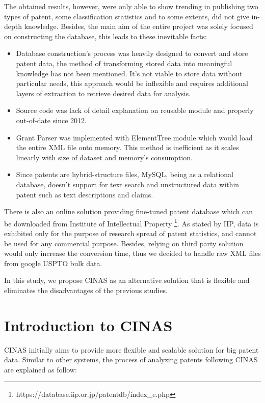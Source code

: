 \documentclass{sig-alternate}
\begin{document}
{The obtained results, however, were only able to show trending in publishing two types of patent, some classification statistics and to some extents, did not give in-depth knowledge. Besides, the main aim of the entire project was solely focused on constructing the database, this leads to these inevitable facts:

\begin{itemize}
\item Database construction's process was heavily designed to convert and store patent data, the method of transforming stored data into meaningful knowledge has not been mentioned. It's not viable to store data without particular needs, this approach would be inflexible and requires additional layers of extraction to retrieve desired data for analysis.
\item Source code was lack of detail explanation on reusable module and properly out-of-date since 2012.
\item Grant Parser was implemented with ElementTree module which would load the entire XML file onto memory. This method is inefficient as it scales linearly with size of dataset and memory's consumption.
\item Since patents are hybrid-structure files, MySQL, being as a relational database, doesn't support for text search and unstructured data within patent such as text descriptions and claims. 
\end{itemize}

There is also an online solution providing fine-tuned patent database which can be downloaded from Institute of Intellectual Property \footnote{https://database.iip.or.jp/patentdb/index\_e.php}. As stated by IIP, data is exhibited only for the purpose of research spread of patent statistics, and cannot be used for any commercial purpose. Besides, relying on third party solution would only increase the conversion time, thus we decided to handle raw XML files from google USPTO bulk data.

In this study, we propose CINAS as an alternative solution that is flexible and eliminates the disadvantages of the previous studies.

\section{Introduction to CINAS}
CINAS initially aims to provide more flexible and scalable solution for big patent data. Similar to other systems, the process of analyzing patents following CINAS are explained as follow:

}
\end{document}
